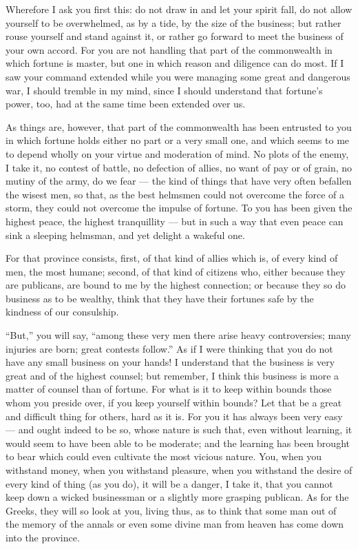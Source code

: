  Wherefore I ask you first this: do not draw in and let your spirit fall, do not allow yourself to be overwhelmed, as by a tide, by the size of the business; but rather rouse yourself and stand against it, or rather go forward to meet the business of your own accord. For you are not handling that part of the commonwealth in which fortune is master, but one in which reason and diligence can do most. If I saw your command extended while you were managing some great and dangerous war, I should tremble in my mind, since I should understand that fortune's power, too, had at the same time been extended over us.

 As things are, however, that part of the commonwealth has been entrusted to you in which fortune holds either no part or a very small one, and which seems to me to depend wholly on your virtue and moderation of mind. No plots of the enemy, I take it, no contest of battle, no defection of allies, no want of pay or of grain, no mutiny of the army, do we fear --- the kind of things that have very often befallen the wisest men, so that, as the best helmsmen could not overcome the force of a storm, they could not overcome the impulse of fortune. To you has been given the highest peace, the highest tranquillity --- but in such a way that even peace can sink a sleeping helmsman, and yet delight a wakeful one.

 For that province consists, first, of that kind of allies which is, of every kind of men, the most humane; second, of that kind of citizens who, either because they are publicans, are bound to me by the highest connection; or because they so do business as to be wealthy, think that they have their fortunes safe by the kindness of our consulship.

 ``But,'' you will say, ``among these very men there arise heavy controversies; many injuries are born; great contests follow.'' As if I were thinking that you do not have any small business on your hands! I understand that the business is very great and of the highest counsel; but remember, I think this business is more a matter of counsel than of fortune. For what is it to keep within bounds those whom you preside over, if you keep yourself within bounds? Let that be a great and difficult thing for others, hard as it is. For you it has always been very easy --- and ought indeed to be so, whose nature is such that, even without learning, it would seem to have been able to be moderate; and the learning has been brought to bear which could even cultivate the most vicious nature. You, when you withstand money, when you withstand pleasure, when you withstand the desire of every kind of thing (as you do), it will be a danger, I take it, that you cannot keep down a wicked businessman or a slightly more grasping publican. As for the Greeks, they will so look at you, living thus, as to think that some man out of the memory of the annals or even some divine man from heaven has come down into the province.

